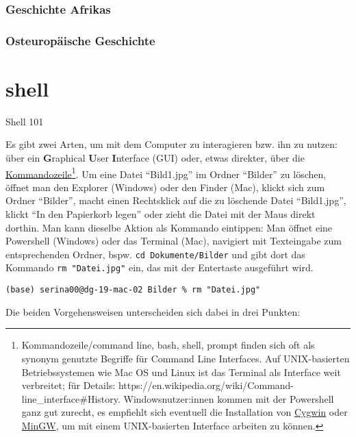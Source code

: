 \documentclass[
  letterpaper,
]{book}
\begin{document}
\hypertarget{geschichte-afrikas}{%
\subsection{Geschichte Afrikas}\label{geschichte-afrikas}}

\hypertarget{osteuropuxe4ische-geschichte}{%
\subsection{Osteuropäische
Geschichte}\label{osteuropuxe4ische-geschichte}}


\hypertarget{shell}{%
\chapter{shell}\label{shell}}

Shell 101

Es gibt zwei Arten, um mit dem Computer zu interagieren bzw. ihn zu
nutzen: über ein \textbf{G}raphical \textbf{U}ser \textbf{I}nterface
(GUI) oder, etwas direkter, über die
\href{https://de.wikipedia.org/wiki/Kommandozeile}{Kommandozeile}\footnote{Kommandozeile/command
  line, bash, shell, prompt finden sich oft als synonym genutzte
  Begriffe für Command Line Interfaces. Auf UNIX-basierten
  Betriebssystemen wie Mac OS und Linux ist das Terminal als Interface
  weit verbreitet; für Details:
  https://en.wikipedia.org/wiki/Command-line\_interface\#History.
  Windowsnutzer:innen kommen mit der Powershell ganz gut zurecht, es
  empfiehlt sich eventuell die Installation von
  \href{https://en.wikipedia.org/wiki/Cygwin}{Cygwin} oder
  \href{https://en.wikipedia.org/wiki/MinGW}{MinGW}, um mit einem
  UNIX-basierten Interface arbeiten zu können.}. Um eine Datei
``Bild1.jpg'' im Ordner ``Bilder'' zu löschen, öffnet man den Explorer
(Windows) oder den Finder (Mac), klickt sich zum Ordner ``Bilder'',
macht einen Rechtsklick auf die zu löschende Datei ``Bild1.jpg'', klickt
``In den Papierkorb legen'' oder zieht die Datei mit der Maus direkt
dorthin. Man kann dieselbe Aktion als Kommando eintippen: Man öffnet
eine Powershell (Windows) oder das Terminal (Mac), navigiert mit
Texteingabe zum entsprechenden Ordner, bspw.
\texttt{cd\ Dokumente/Bilder} und gibt dort das Kommando
\texttt{rm\ "Datei.jpg"} ein, das mit der Entertaste ausgeführt wird.

\texttt{(base)\ serina00@dg-19-mac-02\ Bilder\ \%\ rm\ "Datei.jpg"}

Die beiden Vorgehensweisen unterscheiden sich dabei in drei Punkten:
\end{document}
